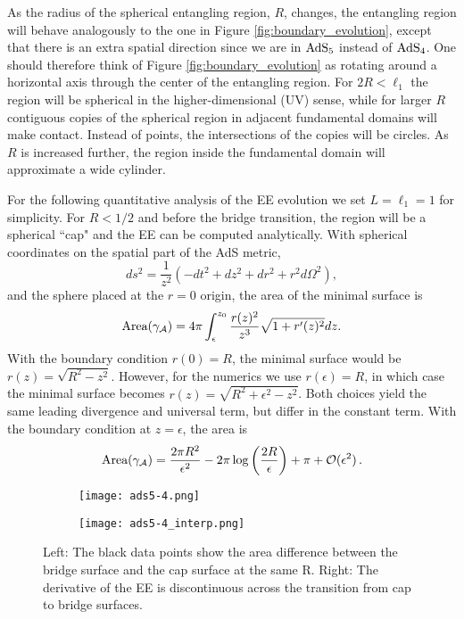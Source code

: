 \documentclass[11 pt]{article}
\begin{document}
As the radius of the spherical entangling region, $R$, changes, the entangling region will behave analogously to the one in Figure \ref{fig:boundary_evolution}, except that there is an extra spatial direction since we are in $\rm AdS_5$ instead of $\rm AdS_4$. One should therefore think of Figure \ref{fig:boundary_evolution} as rotating around a horizontal axis through the center of the entangling region.
For $2R<\ell_1$ the region will be spherical in the higher-dimensional (UV) sense, while for larger $R$ contiguous copies of the spherical region in adjacent fundamental domains will make contact. Instead of points, the intersections of the copies will be circles. As $R$ is increased further, the region inside the fundamental domain will approximate a wide cylinder.

For the following quantitative analysis of the EE evolution we set $L=\ell_1=1$ for simplicity. For $R<1/2$ and before the bridge transition, the region will be a spherical ``cap" and the EE can be computed analytically.
With spherical coordinates on the spatial part of the AdS metric,
$$ds^2 = \frac{1}{z^2}\left(-dt^2+dz^2+dr^2 +r^2d\Omega^2\right),$$
and the sphere placed at the $r=0$ origin, the area of the minimal surface is
\begin{equation}
    \text{Area}(\gamma_{\cal A})=4\pi\int_\epsilon^{z_0}\frac{r(z)^2}{z^3}\sqrt{1+r'(z)^2}dz.
    \label{sphere_area}
\end{equation}
With the boundary condition $r(0)=R$, the minimal surface would be $r(z)=\sqrt{R^2-z^2}$. However, for the numerics we use $r(\epsilon)=R$, in which case the minimal surface becomes $r(z)=\sqrt{R^2+\epsilon^2-z^2}$. Both choices yield the same leading divergence and universal term, but differ in the constant term. With the boundary condition at $z=\epsilon$, the area is
\begin{equation} \label{sphere exp}
     \text{Area}(\gamma_{\cal A}) = \frac{2\pi R^2}{\epsilon^2} - 2\pi\log\left(\frac{2R}{\epsilon}\right) +\pi + \mathcal{O}(\epsilon^2)\,.
\end{equation}


\begin{figure}
     \centering
     \begin{subfigure}[h!]{0.49\textwidth}
         \centering
         \texttt{[image: ads5-4.png]}
     \end{subfigure}
     \hspace{0 pt}
     \begin{subfigure}[h!]{0.49\textwidth}
         \centering
         \texttt{[image: ads5-4\_interp.png]}
     \end{subfigure}
    \caption{Left: The black data points show the area difference between the bridge surface and the cap surface at the same R. Right: The derivative of the EE is discontinuous across the transition from cap to bridge surfaces.}
    \label{fig:Ads5-4}
\end{figure}
\end{document}
